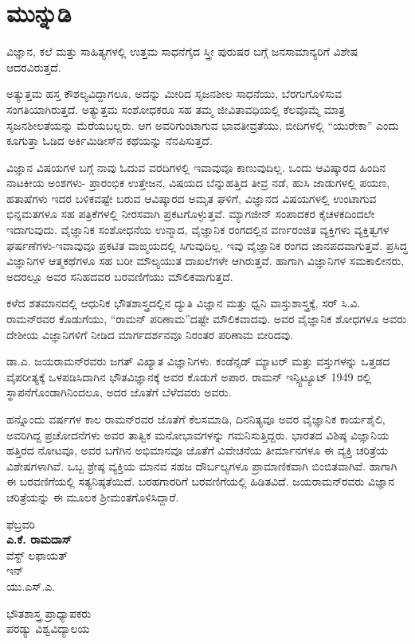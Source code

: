 
\chapter*{ಮುನ್ನುಡಿ}

ವಿಜ್ಞಾನ, ಕಲೆ ಮತ್ತು ಸಾಹಿತ್ಯಗಳಲ್ಲಿ ಉತ್ತಮ ಸಾಧನೆಗೈದ ಸ್ತ್ರೀ ಪುರುಷರ ಬಗ್ಗೆ ಜನಸಾಮಾನ್ಯರಿಗೆ ವಿಶೇಷ ಆದರವಿರುತ್ತದೆ.

ಅತ್ಯುತ್ತಮ ಹಸ್ತ ಕೌಶಲ್ಯವಿದ್ದಾಗಲೂ, ಅದನ್ನು ಮೀರಿದ ಸೃಜನಶೀಲ ಸಾಧನೆಯು, ಬೆರಗುಗೊಳಿಸುವ ಸಂಗತಿಯಾಗಿರುತ್ತದೆ. ಅತ್ಯುತ್ತಮ ಸಂಶೋಧಕರೂ ಸಹ ತಮ್ಮ ಜೀವಿತಾವಧಿಯಲ್ಲಿ ಕೆಲವೊಮ್ಮೆ ಮಾತ್ರ ಸೃಜನಶೀಲತೆಯನ್ನು ಮೆರೆಯಬಲ್ಲರು. ಆಗ ಅವರಿಗುಂಟಾಗುವ ಭಾವತೀವ್ರತೆಯು, ಬೀದಿಗಳಲ್ಲಿ “ಯುರೇಕಾ” ಎಂದು ಕೂಗುತ್ತಾ ಓಡಿದ ಅರ್ಕಿಮಿಡೀಸ್‍ನ ಕಥೆಯನ್ನು ನೆನಪಿಸುತ್ತದೆ.

ವಿಜ್ಞಾನ ವಿಷಯಗಳ ಬಗ್ಗೆ ನಾವು ಓದುವ ವರದಿಗಳಲ್ಲಿ ಇವಾವುವೂ ಕಾಣುವುದಿಲ್ಲ. ಒಂದು ಆವಿಷ್ಕಾರದ ಹಿಂದಿನ ನಾಟಕೀಯ ಅಂಶಗಳು- ಪ್ರಾರಂಭಿಕ ಉತ್ತೇಜನ, ವಿಷಯದ ಬೆನ್ನುಹತ್ತಿದ ತೀವ್ರ ನಡೆ, ಹುಸಿ ಜಾಡುಗಳಲ್ಲಿ ಪಯಣ, ಹತಾಷೆಗಳು ಇದರ ಬಳಿಕವಷ್ಟೇ ಬರುವ ಆವಿಷ್ಕಾರದ ಅಮೃತ ಘಳಿಗೆ, ವಿಜ್ಞಾನದ ವಿಷಯಗಳಲ್ಲಿ ಉಂಟಾಗುವ ಭಿನ್ನಮತಗಳೂ ಸಹ ಪತ್ರಿಕೆಗಳಲ್ಲಿ ನೀರಸವಾಗಿ ಪ್ರಕಟಗೊಳ್ಳುತ್ತವೆ. ಮ್ಯಾಗಜೀನ್ ಸಂಪಾದಕರ ಕೈಚಳಕದಿಂದಲೇ ಇದಾಗುವುದು. ವೈಜ್ಞಾನಿಕ ಸಂಶೋಧನೆಯ ಉನ್ಮಾದ, ವೈಜ್ಞಾನಿಕ ರಂಗದಲ್ಲಿನ ವರ್ಣರಂಜಿತ ವ್ಯಕ್ತಿಗಳು ವ್ಯಕ್ತಿತ್ವಗಳ ಘರ್ಷಣೆಗಳು-ಇವಾವುವೂ ಪ್ರಕಟಿತ ವಾಙ್ಮಯದಲ್ಲಿ ಸಿಗುವುದಿಲ್ಲ. ಇವು ವೈಜ್ಞಾನಿಕ ರಂಗದ ಜಾನಪದವಾಗುತ್ತವೆ. ಪ್ರಸಿದ್ಧ ವಿಜ್ಞಾನಿಗಳ ಆತ್ಮಕಥೆಗಳೂ ಸಹ ಬರೀ ಮೌಲ್ಯಯುತ ದಾಖಲೆಗಳೇ ಆಗಿರುತ್ತವೆ. ಹಾಗಾಗಿ ವಿಜ್ಞಾನಿಗಳ ಸಮಕಾಲೀನರು, ಅದರಲ್ಲೂ ಅವರ ಸನಿಹದವರ ಬರವಣಿಗೆಯು ಮೌಲಿಕವಾಗುತ್ತದೆ.

ಕಳೆದ ಶತಮಾನದಲ್ಲಿ ಆಧುನಿಕ ಭೌತಶಾಸ್ತ್ರದಲ್ಲಿನ ದ್ಯುತಿ ವಿಜ್ಞಾನ ಮತ್ತು ಧ್ವನಿ ವಾಸ್ತುಶಾಸ್ತ್ರಕ್ಕೆ, ಸರ್ ಸಿ.ವಿ. ರಾಮನ್‍ರವರ ಕೊಡುಗೆಯು, “ರಾಮನ್ ಪರಿಣಾಮ”ದಷ್ಟೇ ಮೌಲಿಕವಾದವು. ಅವರ ವೈಜ್ಞಾನಿಕ ಶೋಧಗಳೂ ಅವರು ದೇಶೀಯ ವಿಜ್ಞಾನಿಗಳಿಗೆ ನೀಡಿದ ಮಾರ್ಗದರ್ಶನವೂ ನಿರಂತರ ಪರಿಣಾಮ ಬೀರಿದವು.

ಡಾ.ಎ. ಜಯರಾಮನ್‍ರವರು ಜಗತ್ ವಿಖ್ಯಾತ ವಿಜ್ಞಾನಿಗಳು. ಕಂಡೆನ್ಸಡ್ ಮ್ಯಾಟರ್ ಮತ್ತು ವಸ್ತುಗಳನ್ನು ಒತ್ತಡದ ವೈಪರೀತ್ಯಕ್ಕೆ ಒಳಪಡಿಸಿದಾಗಿನ ಭೌತವಿಜ್ಞಾನಕ್ಕೆ ಅವರ ಕೊಡುಗೆ ಅಪಾರ. ರಾಮನ್ ಇನ್ಸ್ಟಿಟ್ಯೂಟ್ 1949 ರಲ್ಲಿ ಸ್ಥಾಪನೆಗೊಂಡಾಗಿನಿಂದಲೂ, ಅದರ ಜೊತೆಗೆ ಬೆಳೆದವರು ಅವರು.

ಹನ್ನೊಂದು ವರ್ಷಗಳ ಕಾಲ ರಾಮನ್‍ರವರ ಜೊತೆಗೆ ಕೆಲಸಮಾಡಿ, ದಿನನಿತ್ಯವೂ ಅವರ ವೈಜ್ಞಾನಿಕ ಕಾರ್ಯಶೈಲಿ, ಅವರಿಗಿದ್ದ ಪ್ರಚೋದನೆಗಳು ಅವರ ತಾತ್ವಿಕ ಮನೋಭಾವಗಳನ್ನು ಗಮನಿಸುತ್ತಿದ್ದರು. ಭಾರತದ ವಿಶಿಷ್ಠ ವಿಜ್ಞಾನಿಯ ಹತ್ತಿರದ ನೋಟವೂ, ಅವರ ಬಗೆಗಿನ ಅಭಿಮಾನವೂ ಜೊತೆಗೆ ವಿವೇಚನೆಯ ತೀರ್ಮಾನಗಳೂ ಈ ವ್ಯಕ್ತಿ ಚರಿತ್ರೆಯ ವಿಶೇಷಗಳಾಗಿವೆ. ಒಬ್ಬ ಶ್ರೇಷ್ಠ ವ್ಯಕ್ತಿಯ ಮಾನವ ಸಹಜ ದೌರ್ಬಲ್ಯಗಳೂ ಪ್ರಾಮಾಣಿಕವಾಗಿ ಬಿಂಬಿತವಾಗಿವೆ. ಹಾಗಾಗಿ ಈ ಬರವಣಿಗೆಯಲ್ಲಿ ಸತ್ಯನಿಷ್ಠತೆಯಿದೆ. ಬರಹಗಾರರಿಗೆ ಬರವಣಿಗೆಯಲ್ಲಿ ಹಿಡಿತವಿದೆ. ಜಯರಾಮನ್‍ರವರು ವಿಜ್ಞಾನ ಚರಿತ್ರೆಯನ್ನು ಈ ಮೂಲಕ ಶ‍್ರೀಮಂತಗೊಳಿಸಿದ್ದಾರೆ.

\begin{flushleft}
  ಫೆಬ್ರವರಿ \\\textbf{ಎ.ಕೆ. ರಾಮದಾಸ್}\\
 ವೆಸ್ಟ್ ಲಫಾಯತ್\\
 ಇನ್ \\
 ಯು.ಎಸ್.ಎ.
\end{flushleft}

\begin{flushright}
ಭೌತಶಾಸ್ತ್ರ ಪ್ರಾಧ್ಯಾಪಕರು\\ಪರಡ್ಯು ವಿಶ್ವವಿದ್ಯಾಲಯ
\end{flushright}

